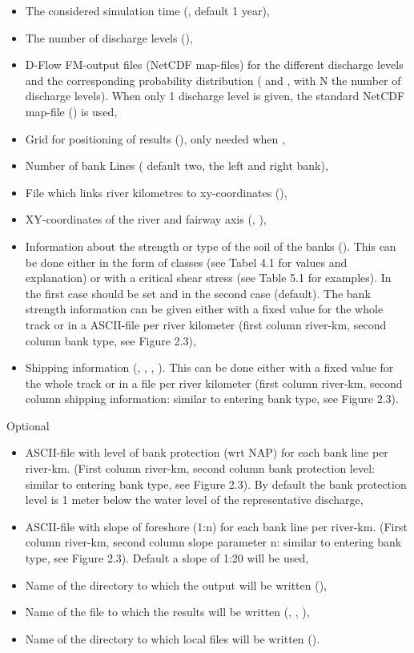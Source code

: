 \begin{itemize}
\item The considered simulation time (, default 1 year),
\item The number of discharge levels (),
\item D-Flow FM-output files (NetCDF map-files) for the different discharge levels and the corresponding probability distribution ( and , with N the number of discharge levels).
When only 1 discharge level is given, the standard NetCDF map-file () is used,
\item Grid for positioning of results (), only needed when ,
\item Number of bank Lines ( default two, the left and right bank),
\item File which links river kilometres to xy-coordinates (),
\item XY-coordinates of the river and fairway axis (, ),
\item Information about the strength or type of the soil of the banks ().
This can be done either in the form of classes (see Tabel 4.1 for values and explanation) or with a critical shear stress (see Table 5.1 for examples).
In the first case  should be set and in the second case  (default).
The bank strength information can be given either with a fixed value for the whole track or in a ASCII-file per river kilometer (first column river-km, second column bank type, see Figure 2.3),
\item Shipping information (, , , ).
This can be done either with a fixed value for the whole track or in a file per river kilometer (first column river-km, second column shipping information: similar to entering bank type, see Figure 2.3).
\end{itemize}

Optional
\begin{itemize}
\item ASCII-file with level of bank protection (wrt NAP) for each bank line per river-km.
(First column river-km, second column bank protection level: similar to entering bank type, see Figure 2.3).
By default the bank protection level is 1 meter below the water level of the representative discharge,
\item ASCII-file with slope of foreshore (1:n) for each bank line per river-km.
(First column river-km, second column slope parameter n: similar to entering bank type, see Figure 2.3).
Default a slope of 1:20 will be used,
\item Name of the directory to which the output will be written (),
\item Name of the file to which the results will be written (, , ),
\item Name of the directory to which local files will be written ().
\end{itemize}

